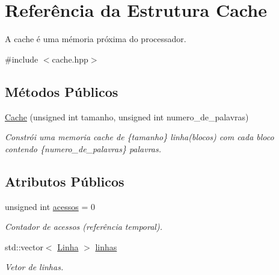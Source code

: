 \hypertarget{structCache}{}\section{Referência da Estrutura Cache}
\label{structCache}


A cache é uma mémoria próxima do processador.  




{\ttfamily \#include $<$cache.\+hpp$>$}

\subsection*{Métodos Públicos}
\begin{DoxyCompactItemize}
\item 
\hyperlink{structCache_a9f868538691619d64b59b858ae0461a8}{Cache} (unsigned int tamanho, unsigned int numero\+\_\+de\+\_\+palavras)
\begin{DoxyCompactList}\small\item\em Constrói uma memoria cache de \{tamanho\} linha(blocos) com cada bloco contendo \{numero\+\_\+de\+\_\+palavras\} palavras. \end{DoxyCompactList}\end{DoxyCompactItemize}
\subsection*{Atributos Públicos}
\begin{DoxyCompactItemize}
\item 
\mbox{\label{structCache_ad32acb42c6e23edcff1dac09d5641ba0}} 
unsigned int \hyperlink{structCache_ad32acb42c6e23edcff1dac09d5641ba0}{acessos} = 0
\begin{DoxyCompactList}\small\item\em Contador de acessos (referência temporal). \end{DoxyCompactList}\item 
\mbox{\label{structCache_acec2c191dc40f6628e48884251e24f42}} 
std\+::vector$<$ \hyperlink{structLinha}{Linha} $>$ \hyperlink{structCache_acec2c191dc40f6628e48884251e24f42}{linhas}
\begin{DoxyCompactList}\small\item\em Vetor de linhas. \end{DoxyCompactList}\end{DoxyCompactItemize}


